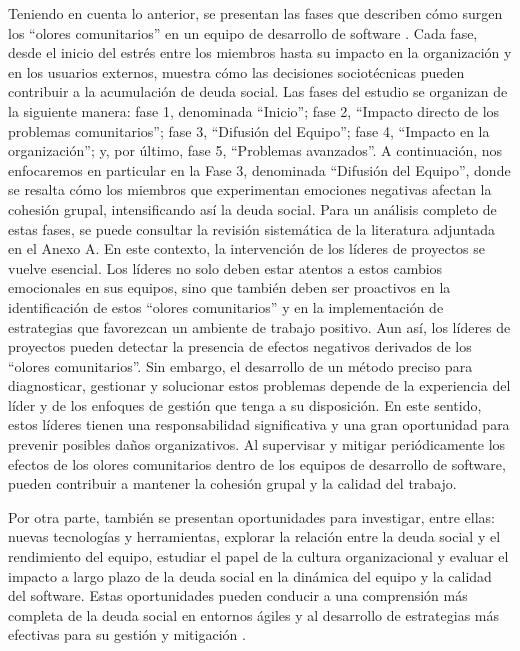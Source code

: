 Teniendo en cuenta lo anterior, se presentan las fases que describen cómo surgen los “olores comunitarios” en un equipo de desarrollo de software \cite{caballero2022communitysmells}. Cada fase, desde el inicio del estrés entre los miembros hasta su impacto en la organización y en los usuarios externos, muestra cómo las decisiones sociotécnicas pueden contribuir a la acumulación de deuda social. Las fases del estudio se organizan de la siguiente manera: fase 1, denominada “Inicio”; fase 2, “Impacto directo de los problemas comunitarios”; fase 3, “Difusión del Equipo”; fase 4, “Impacto en la organización”; y, por último, fase 5, “Problemas avanzados”. A continuación, nos enfocaremos en particular en la Fase 3, denominada “Difusión del Equipo”, donde se resalta cómo los miembros que experimentan emociones negativas afectan la cohesión grupal, intensificando así la deuda social. Para un análisis completo de estas fases, se puede consultar la revisión sistemática de la literatura adjuntada en el Anexo A. En este contexto, la intervención de los líderes de proyectos se vuelve esencial. Los líderes no solo deben estar atentos a estos cambios emocionales en sus equipos, sino que también deben ser proactivos en la identificación de estos “olores comunitarios” y en la implementación de estrategias que favorezcan un ambiente de trabajo positivo. Aun así, los líderes de proyectos pueden detectar la presencia de efectos negativos derivados de los “olores comunitarios”. Sin embargo, el desarrollo de un método preciso para diagnosticar, gestionar y solucionar estos problemas depende de la experiencia del líder y de los enfoques de gestión que tenga a su disposición. En este sentido, estos líderes tienen una responsabilidad significativa y una gran oportunidad para prevenir posibles daños organizativos. Al supervisar y mitigar periódicamente los efectos de los olores comunitarios dentro de los equipos de desarrollo de software, pueden contribuir a mantener la cohesión grupal y la calidad del trabajo.

Por otra parte, también se presentan oportunidades para investigar, entre ellas: nuevas tecnologías y herramientas, explorar la relación entre la deuda social y el rendimiento del equipo, estudiar el papel de la cultura organizacional y evaluar el impacto a largo plazo de la deuda social en la dinámica del equipo y la calidad del software. Estas oportunidades pueden conducir a una comprensión más completa de la deuda social en entornos ágiles y al desarrollo de estrategias más efectivas para su gestión y mitigación \cite{saeeda2024multivocal}.

